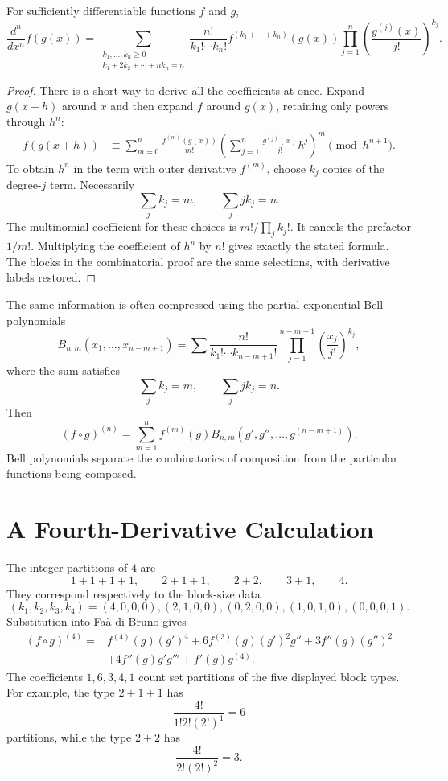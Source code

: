 \begin{theorem}
For sufficiently differentiable functions \(f\) and \(g\),
\[
  \frac{d^n}{dx^n}f(g(x))
  =\sum_{\substack{k_1,\ldots,k_n\geq0\\
                    k_1+2k_2+\cdots+nk_n=n}}
  \frac{n!}{k_1!\cdots k_n!}
  f^{(k_1+\cdots+k_n)}(g(x))
  \prod_{j=1}^{n}
  \left(\frac{g^{(j)}(x)}{j!}\right)^{k_j}.
\]
\end{theorem}


\begin{proof}
There is a short way to derive all the coefficients at once. Expand $g(x+h)$ around $x$ and then expand $f$ around $g(x)$, retaining only powers through $h^n$:
\[
\begin{aligned}
 f(g(x+h))
 &\equiv \sum_{m=0}^{n}\frac{f^{(m)}(g(x))}{m!}
 \left(\sum_{j=1}^{n}\frac{g^{(j)}(x)}{j!}h^j\right)^m
 \pmod{h^{n+1}}.
\end{aligned}
\]
To obtain $h^n$ in the term with outer derivative $f^{(m)}$, choose $k_j$ copies of the degree-$j$ term. Necessarily
\[
 \sum_j k_j=m,\qquad \sum_j j k_j=n.
\]
The multinomial coefficient for these choices is $m!/\prod_j k_j!$. It cancels the prefactor $1/m!$. Multiplying the coefficient of $h^n$ by $n!$ gives exactly the stated formula. The blocks in the combinatorial proof are the same selections, with derivative labels restored.
\end{proof}

The same information is often compressed using the partial exponential Bell polynomials
\[
  B_{n,m}(x_1,\ldots,x_{n-m+1})
  =\sum
  \frac{n!}{k_1!\cdots k_{n-m+1}!}
  \prod_{j=1}^{n-m+1}\left(\frac{x_j}{j!}\right)^{k_j},
\]
where the sum satisfies
\[
  \sum_j k_j=m,
  \qquad
  \sum_j j k_j=n.
\]
Then
\[
  (f\circ g)^{(n)}
  =\sum_{m=1}^{n}f^{(m)}(g)
   B_{n,m}(g',g'',\ldots,g^{(n-m+1)}).
\]
Bell polynomials separate the combinatorics of composition from the particular functions being composed.

\section{A Fourth-Derivative Calculation}

The integer partitions of \(4\) are
\[
  1+1+1+1,\qquad
  2+1+1,\qquad
  2+2,\qquad
  3+1,\qquad
  4.
\]
They correspond respectively to the block-size data
\[
  (k_1,k_2,k_3,k_4)
  =(4,0,0,0),(2,1,0,0),(0,2,0,0),(1,0,1,0),(0,0,0,1).
\]
Substitution into Faà di Bruno gives
\[
\begin{aligned}
(f\circ g)^{(4)}={}&
 f^{(4)}(g)(g')^4
 +6f^{(3)}(g)(g')^2g''
 +3f''(g)(g'')^2\\
&+4f''(g)g'g'''
 +f'(g)g^{(4)}.
\end{aligned}
\]
The coefficients \(1,6,3,4,1\) count set partitions of the five displayed block types.  For example, the type \(2+1+1\) has
\[
  \frac{4!}{1!2!(2!)^1}=6
\]
partitions, while the type \(2+2\) has
\[
  \frac{4!}{2!(2!)^2}=3.
\]

